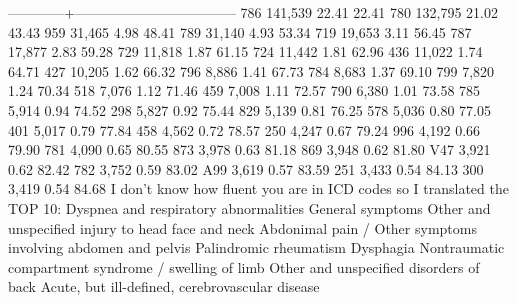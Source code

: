 \markdownRendererInterblockSeparator
{}------------+----------------------------------- 786 \markdownRendererPipe{} 141,539 22.41 22.41 780 \markdownRendererPipe{} 132,795 21.02 43.43 959 \markdownRendererPipe{} 31,465 4.98 48.41 789 \markdownRendererPipe{} 31,140 4.93 53.34 719 \markdownRendererPipe{} 19,653 3.11 56.45 787 \markdownRendererPipe{} 17,877 2.83 59.28 729 \markdownRendererPipe{} 11,818 1.87 61.15 724 \markdownRendererPipe{} 11,442 1.81 62.96 436 \markdownRendererPipe{} 11,022 1.74 64.71 427 \markdownRendererPipe{} 10,205 1.62 66.32 796 \markdownRendererPipe{} 8,886 1.41 67.73 784 \markdownRendererPipe{} 8,683 1.37 69.10 799 \markdownRendererPipe{} 7,820 1.24 70.34 518 \markdownRendererPipe{} 7,076 1.12 71.46 459 \markdownRendererPipe{} 7,008 1.11 72.57 790 \markdownRendererPipe{} 6,380 1.01 73.58 785 \markdownRendererPipe{} 5,914 0.94 74.52 298 \markdownRendererPipe{} 5,827 0.92 75.44 829 \markdownRendererPipe{} 5,139 0.81 76.25 578 \markdownRendererPipe{} 5,036 0.80 77.05 401 \markdownRendererPipe{} 5,017 0.79 77.84 458 \markdownRendererPipe{} 4,562 0.72 78.57 250 \markdownRendererPipe{} 4,247 0.67 79.24 996 \markdownRendererPipe{} 4,192 0.66 79.90 781 \markdownRendererPipe{} 4,090 0.65 80.55 873 \markdownRendererPipe{} 3,978 0.63 81.18 869 \markdownRendererPipe{} 3,948 0.62 81.80 V47 \markdownRendererPipe{} 3,921 0.62 82.42 782 \markdownRendererPipe{} 3,752 0.59 83.02 A99 \markdownRendererPipe{} 3,619 0.57 83.59 251 \markdownRendererPipe{} 3,433 0.54 84.13 300 \markdownRendererPipe{} 3,419 0.54 84.68 I don't know how fluent you are in ICD codes so I translated the TOP 10:\markdownRendererInterblockSeparator
{}\markdownRendererOlBeginTight
{}Dyspnea and respiratory abnormalities\markdownRendererOlItemEnd 
{}General symptoms\markdownRendererOlItemEnd 
{}Other and unspecified injury to head face and neck\markdownRendererOlItemEnd 
{}Abdonimal pain / Other symptoms involving abdomen and pelvis\markdownRendererOlItemEnd 
{}Palindromic rheumatism\markdownRendererOlItemEnd 
{}Dysphagia\markdownRendererOlItemEnd 
{}Nontraumatic compartment syndrome / swelling of limb\markdownRendererOlItemEnd 
{}Other and unspecified disorders of back\markdownRendererOlItemEnd 
{}Acute, but ill-defined, cerebrovascular disease\markdownRendererOlItemEnd 

